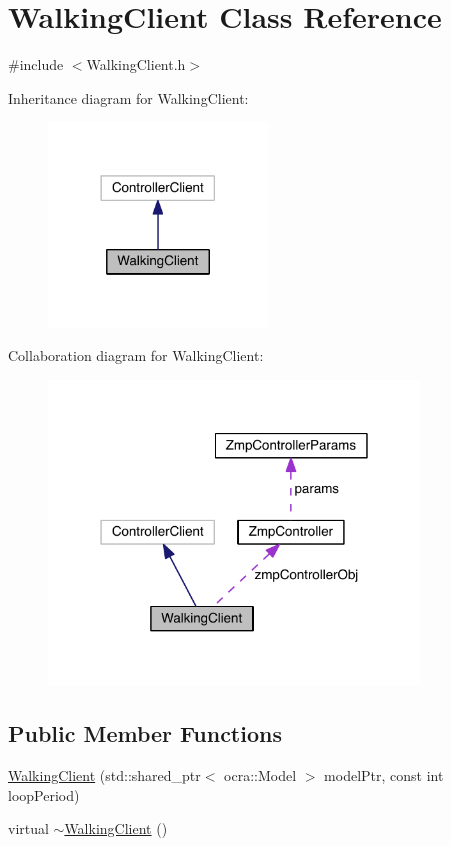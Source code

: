 \hypertarget{classWalkingClient}{}\section{Walking\+Client Class Reference}
\label{classWalkingClient}


{\ttfamily \#include $<$Walking\+Client.\+h$>$}



Inheritance diagram for Walking\+Client\+:\nopagebreak
\begin{figure}[H]
\begin{center}
\leavevmode
\includegraphics[width=165pt]{classWalkingClient__inherit__graph}
\end{center}
\end{figure}


Collaboration diagram for Walking\+Client\+:
\nopagebreak
\begin{figure}[H]
\begin{center}
\leavevmode
\includegraphics[width=279pt]{classWalkingClient__coll__graph}
\end{center}
\end{figure}
\subsection*{Public Member Functions}
\begin{DoxyCompactItemize}
\item 
\hyperlink{classWalkingClient_a6c9002a44a54814c4b482739824e39aa}{Walking\+Client} (std\+::shared\+\_\+ptr$<$ ocra\+::\+Model $>$ model\+Ptr, const int loop\+Period)
\item 
virtual \hyperlink{classWalkingClient_a1dbc0308f844aea6542750104fddf8e2}{$\sim$\+Walking\+Client} ()
\end{DoxyCompactItemize}
